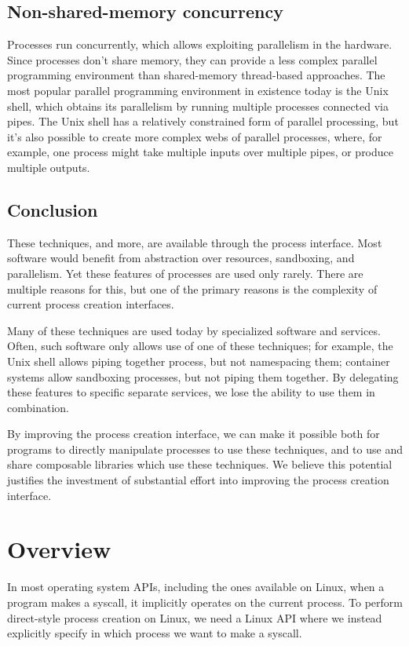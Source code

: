 \documentclass{acmart}
\begin{document}
\subsection{Non-shared-memory concurrency}
Processes run concurrently,
which allows exploiting parallelism in the hardware.
Since processes don't share memory,
they can provide a less complex parallel programming environment
than shared-memory thread-based approaches.
The most popular parallel programming environment in existence today is the Unix shell,
which obtains its parallelism by running multiple processes connected via pipes.
The Unix shell has a relatively constrained form of parallel processing,
but it's also possible to create more complex webs of parallel processes,
where, for example, one process might take multiple inputs over multiple pipes,
or produce multiple outputs.
\subsection{Conclusion}
These techniques, and more, are available through the process interface.
Most software would benefit from abstraction over resources, sandboxing, and parallelism.
Yet these features of processes are used only rarely.
There are multiple reasons for this,
but one of the primary reasons is the complexity of current process creation interfaces.

Many of these techniques are used today by specialized software and services.
Often, such software only allows use of one of these techniques;
for example, the Unix shell allows piping together process, but not namespacing them;
container systems allow sandboxing processes, but not piping them together.
By delegating these features to specific separate services,
we lose the ability to use them in combination.

By improving the process creation interface,
we can make it possible both for programs to directly manipulate processes to use these techniques,
and to use and share composable libraries which use these techniques.
We believe this potential justifies the investment of substantial effort
into improving the process creation interface.
\section{Overview}\label{examples}
In most operating system APIs, including the ones available on Linux,
when a program makes a syscall, it implicitly operates on the current process.
To perform direct-style process creation on Linux,
we need a Linux API where we instead explicitly specify in which process we want to make a syscall.
\end{document}
